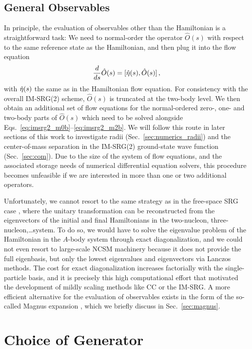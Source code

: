 \subsection{General Observables\label{sec:observables}}
In principle, the evaluation of observables other than the Hamiltonian
is a straightforward task: We need to normal-order the operator
$\hat{O}(s)$ with respect to the same reference state as the Hamiltonian,
and then plug it into the flow equation
\begin{equation}\label{eq:obsflow}
  \totd{}{s}\hat{O}(s) = \comm{\etaO(s)}{\hat{O}(s)}\,,
\end{equation} 
with $\hat{\eta}(s)$ the same as in the Hamiltonian flow equation. For
consistency with the overall IM-SRG(2) scheme, $\hat{O}(s)$ is truncated
at the two-body level. We then obtain an additional set of flow
equations for the normal-ordered zero-, one- and two-body parts of
$\hat{O}(s)$ which need to be solved alongside
Eqs.~\eqref{eq:imsrg2_m0b}--\eqref{eq:imsrg2_m2b}. We will follow this
route in later sections of this work to investigate radii
(Sec.~\ref{sec:numerics_radii}) and the center-of-mass separation in
the IM-SRG(2) ground-state wave function (Sec.~\ref{sec:com}). Due to
the size of the system of flow equations, and the associated storage
needs of numerical differential equation solvers, this procedure
becomes unfeasible if we are interested in more than one or two
additional operators.

Unfortunately, we cannot resort to the same strategy as in the
free-space SRG case \cite{Anderson:2010br,Bogner:2010pq}, where the
unitary transformation can be reconstructed from the eigenvectors of
the initial and final Hamiltonians in the two-nucleon,
three-nucleon,\ldots system. To do so, we would have to solve the
eigenvalue problem of the Hamiltonian in the $A$-body system through
exact diagonalization, and we could not even resort to large-scale
NCSM machinery because it does not provide the full eigenbasis, but
only the lowest eigenvalues and eigenvectors via Lanczos methods. The
cost for exact diagonalization increases factorially with the
single-particle basis, and it is precisely this high computational
effort that motivated the development of mildly scaling methods like
CC or the IM-SRG. A more efficient alternative for the evaluation of
observables exists in the form of the so-called Magnus expansion
\cite{Blanes:2009fk,Morris:2015ve}, which we briefly discuss in
Sec.~\ref{sec:magnus}.



\section{\label{sec:generators}Choice of Generator}

